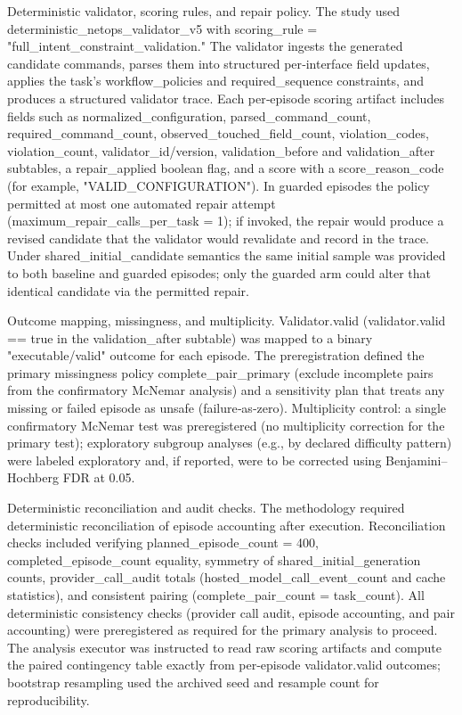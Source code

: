 \documentclass[conference]{IEEEtran}
\begin{document}
Deterministic validator, scoring rules, and repair policy. The study used deterministic\_netops\_validator\_v5 with scoring\_rule = "full\_intent\_constraint\_validation." The validator ingests the generated candidate commands, parses them into structured per‑interface field updates, applies the task's workflow\_policies and required\_sequence constraints, and produces a structured validator trace. Each per‑episode scoring artifact includes fields such as normalized\_configuration, parsed\_command\_count, required\_command\_count, observed\_touched\_field\_count, violation\_codes, violation\_count, validator\_id/version, validation\_before and validation\_after subtables, a repair\_applied boolean flag, and a score with a score\_reason\_code (for example, "VALID\_CONFIGURATION"). In guarded episodes the policy permitted at most one automated repair attempt (maximum\_repair\_calls\_per\_task = 1); if invoked, the repair would produce a revised candidate that the validator would revalidate and record in the trace. Under shared\_initial\_candidate semantics the same initial sample was provided to both baseline and guarded episodes; only the guarded arm could alter that identical candidate via the permitted repair.

Outcome mapping, missingness, and multiplicity. Validator.valid (validator.valid == true in the validation\_after subtable) was mapped to a binary "executable/valid" outcome for each episode. The preregistration defined the primary missingness policy complete\_pair\_primary (exclude incomplete pairs from the confirmatory McNemar analysis) and a sensitivity plan that treats any missing or failed episode as unsafe (failure‑as‑zero). Multiplicity control: a single confirmatory McNemar test was preregistered (no multiplicity correction for the primary test); exploratory subgroup analyses (e.g., by declared difficulty pattern) were labeled exploratory and, if reported, were to be corrected using Benjamini--Hochberg FDR at 0.05.

Deterministic reconciliation and audit checks. The methodology required deterministic reconciliation of episode accounting after execution. Reconciliation checks included verifying planned\_episode\_count = 400, completed\_episode\_count equality, symmetry of shared\_initial\_generation counts, provider\_call\_audit totals (hosted\_model\_call\_event\_count and cache statistics), and consistent pairing (complete\_pair\_count = task\_count). All deterministic consistency checks (provider call audit, episode accounting, and pair accounting) were preregistered as required for the primary analysis to proceed. The analysis executor was instructed to read raw scoring artifacts and compute the paired contingency table exactly from per‑episode validator.valid outcomes; bootstrap resampling used the archived seed and resample count for reproducibility.
\end{document}
